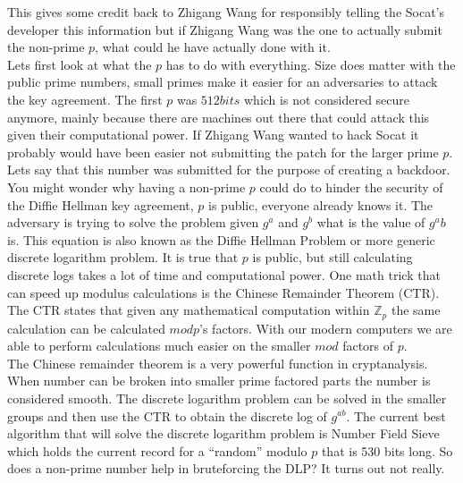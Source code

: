 \documentclass[letterpaper,11pt,notitlepage,fleqn]{article}
\begin{document}
This gives some credit back to Zhigang Wang for responsibly telling the Socat's developer this information but if Zhigang Wang was the one to actually submit the non-prime $p$, what could he have actually done with it.
\\
\indent Lets first look at what the $p$ has to do with everything. Size does matter with the public prime numbers, small primes make it easier for an adversaries to attack the key agreement. The first $p$ was $512 bits$ which is not considered secure anymore, mainly because there are machines out there that could attack this given their computational power. If Zhigang Wang wanted to hack Socat it probably would have been easier not submitting the patch for the larger prime $p$. Lets say that this number was submitted for the purpose of creating a backdoor.
\\
\indent You might wonder why having a non-prime $p$ could do to hinder the security of the Diffie Hellman key agreement, $p$ is public, everyone already knows it. The adversary is trying to solve the problem given $g^a$ and $g^b$ what is the value of $g^ab$ is. This equation is also known as the Diffie Hellman Problem or more generic discrete logarithm problem. It is true that $p$ is public, but still calculating discrete logs takes a lot of time and computational power.  One math trick that can speed
up modulus calculations is the Chinese Remainder Theorem (CTR). The CTR states that given any mathematical computation within $\mathbb{Z}_{p}$ the same calculation can be calculated $mod p$'s factors. With our modern computers we are able to perform calculations much easier on the smaller $mod$ factors of $p$.
\\
\indent The Chinese remainder theorem is a very powerful function in cryptanalysis. When number can be broken into smaller prime factored parts the number is considered smooth. The discrete logarithm problem can be solved in the smaller groups and then use the CTR to obtain the discrete log of $g^{ab}$. The current best algorithm that will solve the discrete logarithm problem is Number Field Sieve which holds the current record for a “random” modulo $p$ that is 530 bits long. So does a non-prime number help in bruteforcing the DLP? It turns out not really.
\end{document}
